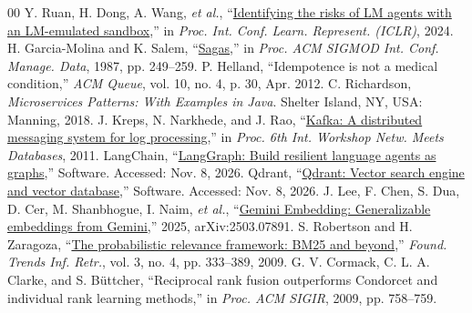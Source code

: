 \documentclass{IEEEtran}
\begin{document}
\begin{thebibliography}{00}
 Y. Ruan, H. Dong, A. Wang, \textit{et al.}, ``\href{https://arxiv.org/abs/2309.15817}{Identifying the risks of LM agents with an LM-emulated sandbox},'' in \textit{Proc. Int. Conf. Learn. Represent. (ICLR)}, 2024.
 H. Garcia-Molina and K. Salem, ``\href{https://doi.org/10.1145/38713.38742}{Sagas},'' in \textit{Proc. ACM SIGMOD Int. Conf. Manage. Data}, 1987, pp. 249--259.
 P. Helland, ``Idempotence is not a medical condition,'' \textit{ACM Queue}, vol. 10, no. 4, p. 30, Apr. 2012.
 C. Richardson, \textit{Microservices Patterns: With Examples in Java}. Shelter Island, NY, USA: Manning, 2018.
 J. Kreps, N. Narkhede, and J. Rao, ``\href{https://course.ece.cmu.edu/~ece845/sp19/docs/kafka.pdf}{Kafka: A distributed messaging system for log processing},'' in \textit{Proc. 6th Int. Workshop Netw. Meets Databases}, 2011.
 LangChain, ``\href{https://github.com/langchain-ai/langgraph}{LangGraph: Build resilient language agents as graphs},'' Software. Accessed: Nov. 8, 2026.
 Qdrant, ``\href{https://github.com/qdrant/qdrant}{Qdrant: Vector search engine and vector database},'' Software. Accessed: Nov. 8, 2026.
 J. Lee, F. Chen, S. Dua, D. Cer, M. Shanbhogue, I. Naim, \textit{et al.}, ``\href{https://arxiv.org/abs/2503.07891}{Gemini Embedding: Generalizable embeddings from Gemini},'' 2025, arXiv:2503.07891.
 S. Robertson and H. Zaragoza, ``\href{https://doi.org/10.1561/1500000019}{The probabilistic relevance framework: BM25 and beyond},'' \textit{Found. Trends Inf. Retr.}, vol. 3, no. 4, pp. 333--389, 2009.
 G. V. Cormack, C. L. A. Clarke, and S. B\"{u}ttcher, ``Reciprocal rank fusion outperforms Condorcet and individual rank learning methods,'' in \textit{Proc. ACM SIGIR}, 2009, pp. 758--759.
\end{thebibliography}
\end{document}
